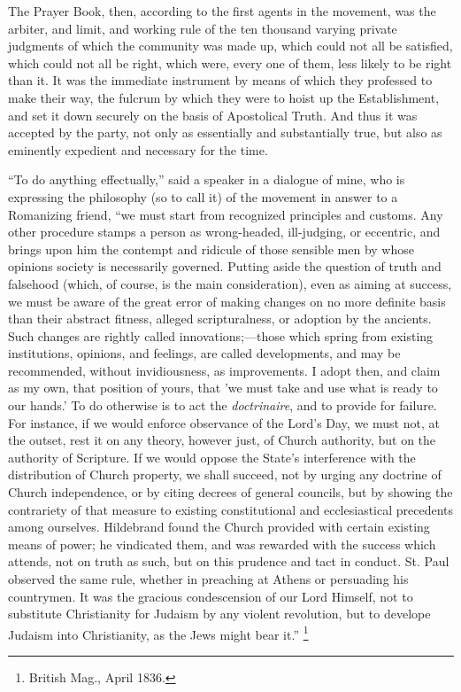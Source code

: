 The Prayer Book, then, according to the first agents in the
movement, was the arbiter, and limit, and working rule of the ten
thousand varying private judgments of which the community was made up,
which could not all be satisfied, which could not all be right, which
were, every one of them, less likely to be right than it. It was the
immediate instrument by means of which they professed to make their
way, the fulcrum by which they were to hoist up the Establishment, and
set it down securely on the basis of Apostolical Truth. And thus it
was accepted by the party, not only as essentially and substantially
true, but also as eminently expedient and necessary for the time.

``To do anything effectually,'' said a speaker in a
dialogue of mine, who is expressing the philosophy (so to call it) of
the movement in answer to a Romanizing friend, ``we must start
from recognized principles and customs. Any other procedure stamps a
person as wrong-headed, ill-judging, or eccentric, and brings upon him
the contempt and ridicule of those sensible men by whose opinions
society is necessarily governed. Putting aside the question of truth
and falsehood (which, of course, is the main consideration), even as
aiming at success, we must be aware of the great error of making
changes on no more definite basis than their abstract fitness, alleged
scripturalness, or adoption by the ancients. Such changes are rightly
called innovations;—those which spring from existing institutions,
opinions, and feelings, are called developments, and may be
recommended, without invidiousness, as improvements. I adopt then, and
claim as my own, that position of yours, that 'we must take and use
what is ready to our hands.' To do otherwise is to act the \emph{doctrinaire},
and to provide for failure. For instance, if we would enforce
observance of the Lord's Day, we must not, at the outset, rest it on
any theory, however just, of Church authority, but on the authority of
Scripture. If we would oppose the State's interference with the
distribution of Church property, we shall succeed, not by urging any
doctrine of Church independence, or by citing decrees of general
councils, but by showing the contrariety of that measure to existing
constitutional and ecclesiastical precedents among ourselves.
Hildebrand found the Church provided with certain existing means of
power; he vindicated them, and was rewarded with the success which
attends, not on truth as such, but on this prudence and tact in
conduct. St. Paul observed the same rule, whether in preaching at
Athens or persuading his countrymen. It was the gracious condescension
of our Lord Himself, not to substitute Christianity for Judaism by any
violent revolution, but to develope Judaism into Christianity, as the
Jews might bear it.'' \footnote{British Mag., April 1836.}

